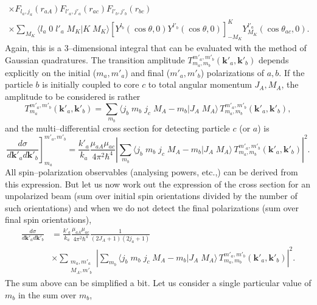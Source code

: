 \begin{subappendices}
\begin{multline}
\times F_{l_a,j_a}(r_{aA})  F_{l'_a,j'_a}(r_{ac})F_{l'_b,j'_b}(r_{bc}) \\
\times \sum_{M_K} \langle l_a\;0\;l'_a\;M_K|K\;M_K\rangle \left[ Y^{l_b} (\cos \theta,0) Y^{l'_b} (\cos \theta,0)\right]^{K}_{-M_K} Y^{l'_a}_{M_K} (\cos \theta_{ac},0).
\end{multline}
Again, this is a 3--dimensional integral that can be evaluated with the method of Gaussian quadratures. The transition amplitude $T_{m_a,m_b}^{m'_a,m'_b}(\mathbf{k}'_a,\mathbf{k}'_b)$ depends explicitly on the initial ($m_a,m'_a$) and final ($m'_a,m'_b$) polarizations of $a,b$. If the particle $b$ is initially coupled to core $c$ to total angular momentum $J_A,M_A$, the amplitude to be considered is rather
\begin{equation}\label{eqC6AppG45}
T_{m_a}^{m'_a,m'_b}(\mathbf{k}'_a,\mathbf{k}'_b)=\sum_{m_b}\langle j_b\;m_b\;j_c\;M_A-m_b|J_A\;M_A\rangle\, T_{m_a,m_b}^{m'_a,m'_b}(\mathbf{k}'_a,\mathbf{k}'_b),
\end{equation}
and the multi--differential cross section for detecting particle $c$ (or $a$) is
\begin{equation}\label{eqC6AppG46}
\left.\frac{d\sigma}{d\mathbf{k}'_ad\mathbf{k}'_b}\right]_{m_a}^{m'_a,m'_b}=\frac{k'_a}{k_a}\frac{\mu_{aA}\mu_{ac}}{4\pi^2\hbar^4}\left|\sum_{m_b}\langle j_b\;m_b\;j_c\;M_A-m_b|J_A\;M_A\rangle\, T_{m_a,m_b}^{m'_a,m'_b}(\mathbf{k}'_a,\mathbf{k}'_b)\right|^2.
\end{equation}
All spin--polarization observables (analysing powers, etc.,) can be derived from this expression. But let us now work out the expression of the cross section for an unpolarized beam (sum over initial spin orientations divided by the number of such orientations) and when we do not detect the final polarizations (sum over final spin orientations), 
\begin{equation}\label{eqC6AppG47}
\begin{split}
\frac{d\sigma}{d\mathbf{k}'_ad\mathbf{k}'_b}&=\frac{k'_a}{k_a}\frac{\mu_{aA}\mu_{ac}}{4\pi^2\hbar^4}\frac{1}{(2J_A+1)(2j_a+1)}\\
&\times \sum_{\substack{m_a,m'_a\\M_A,m'_b}}\left|\sum_{m_b}\langle j_b\;m_b\;j_c\;M_A-m_b|J_A\;M_A\rangle\, T_{m_a,m_b}^{m'_a,m'_b}(\mathbf{k}'_a,\mathbf{k}'_b)\right|^2.
\end{split}
\end{equation}
The sum above can be simplified a bit. Let us consider a single particular value of $m_b$ in the sum over $m_b$,
\begin{equation}\label{eqC6AppG48}

\end{equation}
\end{subappendices}
